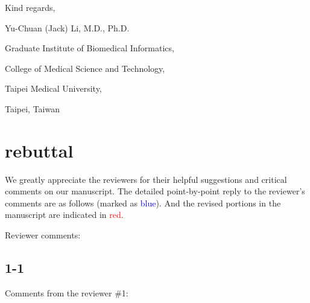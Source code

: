 \documentclass[preprint,12pt]{elsarticle}
\begin{document}
Kind regards,

Yu-Chuan (Jack) Li, M.D., Ph.D.

Graduate Institute of Biomedical Informatics, 

College of Medical Science and Technology,

Taipei Medical University,

Taipei, Taiwan



\section{rebuttal} %
We greatly appreciate the reviewers for their helpful suggestions and critical comments on our manuscript. The detailed point-by-point reply to the reviewer’s comments are as follows (marked as \textcolor{blue}{blue}). 
And the revised portions in the manuscript are indicated in \textcolor{red}{red}.

Reviewer comments:

\subsection*{1-1}
Comments from the reviewer \#1:
\end{document}

